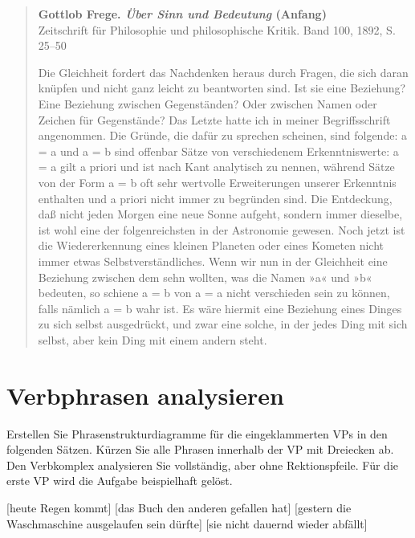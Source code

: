 \begin{quote}
  \textbf{Gottlob Frege. \textit{Über Sinn und Bedeutung} (Anfang)}\\
  \footnotesize{Zeitschrift für Philosophie und philosophische Kritik. Band 100, 1892, S. 25–50}\\
  
  \begin{nohyphens}
  \begin{spread}
    Die Gleichheit fordert das Nachdenken heraus durch Fragen, die sich daran knüpfen und nicht ganz leicht zu beantworten sind.
    Ist sie eine Beziehung? Eine Beziehung zwischen Gegenständen? Oder zwischen Namen oder Zeichen für Gegenstände?
    Das Letzte hatte ich in meiner Begriffsschrift angenommen.
    Die Gründe, die dafür zu sprechen scheinen, sind folgende: a = a und a = b sind offenbar Sätze von verschiedenem Erkenntniswerte: a = a gilt a priori und ist nach Kant analytisch zu nennen, während Sätze von der Form a = b oft sehr wertvolle Erweiterungen unserer Erkenntnis enthalten und a priori nicht immer zu begründen sind.
    Die Entdeckung, daß nicht jeden Morgen eine neue Sonne aufgeht, sondern immer dieselbe, ist wohl eine der folgenreichsten in der Astronomie gewesen.
    Noch jetzt ist die Wiedererkennung eines kleinen Planeten oder eines Kometen nicht immer etwas Selbstverständliches.
    Wenn wir nun in der Gleichheit eine Beziehung zwischen dem sehn wollten, was die Namen »a« und »b« bedeuten, so schiene a = b von a = a nicht verschieden sein zu können, falls nämlich a = b wahr ist.
    Es wäre hiermit eine Beziehung eines Dinges zu sich selbst ausgedrückt, und zwar eine solche, in der jedes Ding mit sich selbst, aber kein Ding mit einem andern steht.
  \end{spread}
  \end{nohyphens}
\end{quote}

\section{Verbphrasen analysieren}\label{sec:analyse}

Erstellen Sie Phrasenstrukturdiagramme für die eingeklammerten VPs in den folgenden Sätzen.
Kürzen Sie alle Phrasen innerhalb der VP mit Dreiecken ab.
Den Verbkomplex analysieren Sie vollständig, aber ohne Rektionspfeile.
Für die erste VP wird die Aufgabe beispielhaft gelöst.

\begin{exe}
\setcounter{xnumi}{0}
  \ex {} [heute Regen kommt]
  \ex {} [das Buch den anderen gefallen hat]
  \ex {} [gestern die Waschmaschine ausgelaufen sein dürfte]
  \ex {} [sie nicht dauernd wieder abfällt]
\end{exe}

